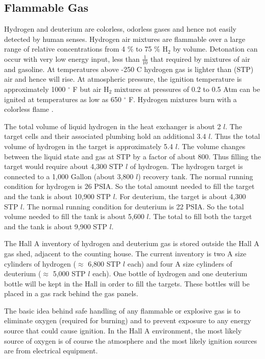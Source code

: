 \begin{safetyen}{10}{5}
\subsection{Flammable Gas}

Hydrogen and deuterium are
colorless, odorless gases and hence not easily detected by human senses.
Hydrogen air mixtures are flammable over a large range of relative
concentrations from 4 $\%$ to 75 $\%$ H$_2$ by volume. Detonation
can occur with very low energy input, less than $\frac{1}{10}$
that required by mixtures of air and gasoline. At temperatures above
-250 C hydrogen gas is lighter than (STP) air and hence will rise.
At atmospheric pressure, the ignition temperature is approximately
1000 $^\circ$ F but air H$_2$ mixtures at pressures of 0.2 to 0.5 Atm can be
ignited at temperatures as low as 650 $^\circ$ F. Hydrogen mixtures
burn with a colorless flame \cite{bi:mc75}.

The total volume of liquid hydrogen in the heat exchanger is about
2 $l$. The target cells and their associated plumbing hold
an additional 3.4 $l$. Thus the total volume of hydrogen
in the target is approximately 5.4 $l$. The volume changes between
the liquid state and gas at STP by a factor of about 800.
Thus filling the target
would require about 4,300 STP $l$ of hydrogen. The hydrogen target is 
connected to a 1,000 Gallon (about 3,800 $l$) recovery tank. The normal 
running condition for hydrogen is 26 PSIA. So the total amount needed
to fill the target and the tank is about 10,900 STP $l$. 
For deuterium, the target is about 4,300 STP $l$. The normal running
condition for deuterium is 22 PSIA. So the total volume needed
to fill the tank is about 5,600 $l$.
The total to fill both the target and the tank is 
about 9,900 STP $l$.

The Hall A inventory of hydrogen and deuterium gas is stored
outside the Hall A gas shed, adjacent to the counting house.
The current inventory is two A size cylinders of hydrogen
($\approx$ 6,800 STP $l$ each) and four A size cylinders
of deuterium ($\approx$ 5,000 STP $l$ each). 
One bottle of hydrogen and one deuterium bottle will be kept in the Hall
in order to fill the targets. These bottles will be placed in a gas rack behind
the gas panels. 

The basic idea behind safe handling of any flammable or explosive gas
is to eliminate oxygen (required for burning)
and to prevent exposure to any energy source that could cause ignition.
In the Hall A environment, the most likely source of oxygen is of course the
atmosphere and the most likely ignition sources are from electrical equipment.


\end{safetyen}

